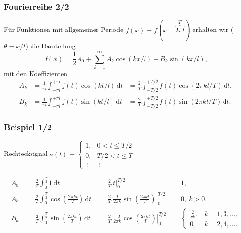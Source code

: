 \begin{frame}
\frametitle{Fourierreihe 2/2}
Für Funktionen mit allgemeiner Periode $f(x)=f(x+\overbrace{2\pi l}^{T})$ erhalten wir ($\theta=x/l$) die Darstellung
\begin{equation*}
 f(x)=\frac{1}{2}A_0 + \sum_{k=1}^{\infty} A_k \cos(kx/l) + B_k \sin(kx/l),
\end{equation*}
mit den Koeffizienten
\begin{align*}
 A_k &=\frac{1}{\pi l}\int_{-\pi l}^{+\pi l} f(t)\cos(kt/l)\,\mathrm{d}t
     &=\frac{2}{T}\int_{-T/2}^{+T/2} f(t)\cos(2\pi kt/T)\,\mathrm{d}t
 ,\\
 B_k &=\frac{1}{\pi l}\int_{-\pi l}^{+\pi l} f(t)\sin(kt/l)\,\mathrm{d}t
     &=\frac{2}{T}\int_{-T/2}^{+T/2} f(t)\sin(2\pi kt/T)\,\mathrm{d}t.
\end{align*}


\end{frame}


\begin{frame}
\frametitle{Beispiel 1/2}

Rechtecksignal $a(t)=\left\{\begin{array}{ll}
                             1, & 0 < t \le T/2\\
                             0, & T/2 < t \le T\\
                             \,\vdots & \ \vdots 
                            \end{array}
  \right.$ 
  \hfill

 \begin{align*}
 A_0&=&\frac{2}{T} \int_{0}^\frac{T}{2} 1\,\mathrm{d}t&=&\frac{2}{T}\bigl|t\bigr|_{0}^{T/2}&=1, \\[1mm]
 A_k&=& \frac{2}{T} \int_{0}^\frac{T}{2} \cos\left(\frac{2\pi kt}{T}\right) \,\mathrm{d}t  
 &=&\frac{2}{T} \left|\frac{T}{2\pi k} \sin\left(\frac{2\pi kt}{T}\right) \right|_0^{T/2} &=0, \ k>0,
 \\[1mm]
 B_k&=& \frac{2}{T} \int_{0}^\frac{T}{2} \sin\left(\frac{2\pi kt}{T}\right) \,\mathrm{d}t  
 &=&\frac{2}{T} \left|\frac{-T}{2\pi k} \cos\left(\frac{2\pi kt}{T}\right) \right|_0^{T/2} &=
 \left\{\begin{array}{ll}
    \frac{2}{\pi k},& k=1,3, \dots ,\\
    0, & k=2,4, \dots .
        \end{array} \right.
 \end{align*}
 
\end{frame}


